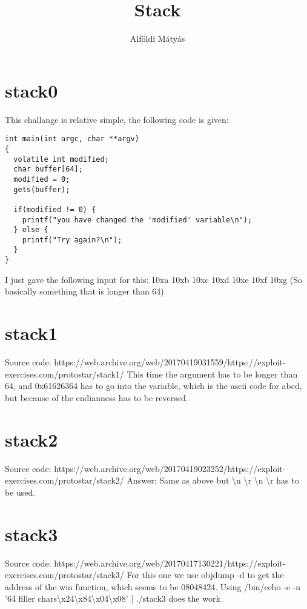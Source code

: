 \documentclass[11pt,a4paper]{article}
\begin{document}
\title{Stack}
\author{Alföldi Mátyás}
\maketitle
\tableofcontents
\pagebreak
\section*{stack0}
\markright{}
This challange is relative simple, the following code is given:
\begin{verbatim}
int main(int argc, char **argv)
{
  volatile int modified;
  char buffer[64];
  modified = 0;
  gets(buffer);

  if(modified != 0) {
    printf("you have changed the 'modified' variable\n");
  } else {
    printf("Try again?\n");
  }
}
\end{verbatim}
I just gave the following input for this:\newline
10xa 10xb 10xc 10xd 10xe 10xf 10xg (So basically something that is longer than 64)
\section*{stack1}
\markright{}
Source code:\newline
https://web.archive.org/web/20170419031559/https://exploit-exercises.com/protostar/stack1/\newline
This time the argument has to be longer than 64, and 0x61626364 has to go into the variable, which is the ascii code for abcd, but because of the endianness has to be reversed.
\section*{stack2}
\markright{}
Source code:\newline
https://web.archive.org/web/20170419023252/https://exploit-exercises.com/protostar/stack2/\newline
Answer:\newline
Same as above but \textbackslash n \textbackslash r \textbackslash n \textbackslash r has to be used.
\section*{stack3}
\markright{}
Source code:\newline
https://web.archive.org/web/20170417130221/https://exploit-exercises.com/protostar/stack3/\newline
For this one we use objdump -d to get the address of the win function, which seems to be 08048424.\newline
Using /bin/echo -e -n '64 filler chars\textbackslash x24\textbackslash x84\textbackslash x04\textbackslash x08' | ./stack3 does the work
\end{document}
